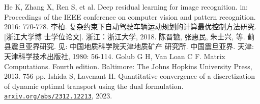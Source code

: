 \begin{thebibliography}{99}
    {}
    He K, Zhang X, Ren S, et al. Deep residual learning for image recognition. in:
    Proceedings of the IEEE conference on computer vision and pattern recognition. 2016:
    770-778.
    {}
    李柏. {复杂约束下自动驾驶车辆运动规划的计算最优控制方法研究}. [浙江大学博
    士学位论文]. 浙江：浙江大学, 2018.
    {}
    陈晋镳, 张惠民, 朱士兴, 等. 蓟县震旦亚界研究. 见: 中国地质科学院天津地质矿产
    研究所. 中国震旦亚界. 天津: 天津科学技术出版社, 1980: 56-114.
    {}
    Golub G H, Van Loan C F. Matrix Computations. Fourth edition. Baltimore: The Johns
    Hopkins University Press, 2013. 756 pp.
    {}
    Ishida S, Lavenant H. Quantitative convergence of a discretization of dynamic optimal transport using the dual formulation.
    \href{https://arxiv.org/abs/2312.12213}{\nolinkurl {arxiv.org/abs/2312.12213}}, 2023.
\end{thebibliography}
    